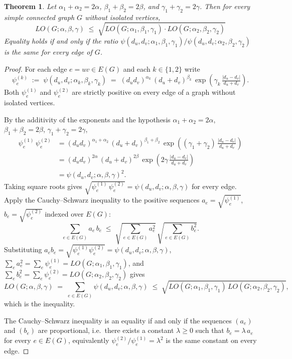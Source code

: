 \documentclass[a5paper, 10pt]{article}
\theoremstyle{plain}
\newtheorem{theorem}{Theorem}
\theoremstyle{remark}
\theoremstyle{definition}
\newcommand{\Wuzi}{LO(G;\alpha,\beta,\gamma)}
\begin{document}
  \begin{theorem}\label{thm:cs}
  Let $\alpha_1 + \alpha_2 = 2\alpha$, $\beta_1 + \beta_2 = 2\beta$,
  and $\gamma_1 + \gamma_2 = 2\gamma$. Then for every simple
  connected graph $G$ without isolated vertices,
  \[
  LO(G; \alpha, \beta, \gamma)
  \;\le\;
  \sqrt{LO(G; \alpha_1, \beta_1, \gamma_1)
         \cdot LO(G; \alpha_2, \beta_2, \gamma_2)}
  \]
  Equality holds if and only if the ratio
  $\psi(d_u, d_v; \alpha_1, \beta_1, \gamma_1)/\psi(d_u, d_v; \alpha_2,
  \beta_2, \gamma_2)$
  is the same for every edge of $G$.
  \end{theorem}

  \begin{proof}
  For each edge $e = uv \in E(G)$ and each $k \in \{1, 2\}$ write
  \[
  \psi_e^{(k)}
  \;:=\; \psi(d_u, d_v; \alpha_k, \beta_k, \gamma_k)
  \;=\; (d_u d_v)^{\alpha_k}\,(d_u + d_v)^{\beta_k}\,
  \exp\!\left(\gamma_k\, \tfrac{|d_u - d_v|}{d_u + d_v}\right).
  \]
  Both $\psi_e^{(1)}$ and $\psi_e^{(2)}$ are strictly positive on
  every edge of a graph without isolated vertices.

  By the additivity of the exponents and the hypothesis
  $\alpha_1 + \alpha_2 = 2\alpha$,
  $\beta_1 + \beta_2 = 2\beta$, $\gamma_1 + \gamma_2 = 2\gamma$,
  \begin{align*}
  \psi_e^{(1)}\,\psi_e^{(2)}
  &= (d_u d_v)^{\alpha_1 + \alpha_2}\,(d_u + d_v)^{\beta_1 + \beta_2}\,
     \exp\!\left((\gamma_1 + \gamma_2)\, \tfrac{|d_u - d_v|}{d_u +
  d_v}\right) \\
  &= (d_u d_v)^{2\alpha}\,(d_u + d_v)^{2\beta}\,
     \exp\!\left(2\gamma\, \tfrac{|d_u - d_v|}{d_u + d_v}\right) \\
  &= \psi(d_u, d_v; \alpha, \beta, \gamma)^{2}.
  \end{align*}
  Taking square roots gives
  $\sqrt{\psi_e^{(1)}\,\psi_e^{(2)}} = \psi(d_u, d_v; \alpha, \beta,
  \gamma)$
  for every edge. Apply the Cauchy--Schwarz inequality to the
  positive sequences $a_e = \sqrt{\psi_e^{(1)}}$,
  $b_e = \sqrt{\psi_e^{(2)}}$ indexed over $E(G)$:
  \[
  \sum_{e \in E(G)} a_e\, b_e
  \;\le\;
  \sqrt{\sum_{e \in E(G)} a_e^{2}}\,
  \sqrt{\sum_{e \in E(G)} b_e^{2}}.
  \]
  Substituting $a_e b_e = \sqrt{\psi_e^{(1)} \psi_e^{(2)}}
     = \psi(d_u, d_v; \alpha, \beta, \gamma)$,
  $\sum_e a_e^2 = \sum_e \psi_e^{(1)} = LO(G; \alpha_1, \beta_1,
  \gamma_1)$,
  and $\sum_e b_e^2 = \sum_e \psi_e^{(2)} = LO(G; \alpha_2, \beta_2,
  \gamma_2)$
  gives
  \[
  \Wuzi
  \;=\; \sum_{e \in E(G)} \psi(d_u, d_v; \alpha, \beta, \gamma)
  \;\le\;
  \sqrt{LO(G; \alpha_1, \beta_1, \gamma_1)\,
        LO(G; \alpha_2, \beta_2, \gamma_2)},
  \]
  which is the inequality.

  The Cauchy--Schwarz inequality is an equality if and only if the
  sequences $(a_e)$ and $(b_e)$ are proportional, i.e.\ there exists
  a constant $\lambda \ge 0$ such that $b_e = \lambda\, a_e$ for
  every $e \in E(G)$, equivalently
  $\psi_e^{(2)}/\psi_e^{(1)} = \lambda^{2}$ is the same constant on
  every edge.
  \end{proof}
\end{document}
